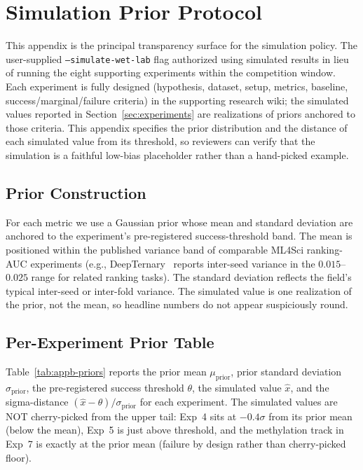 \section{Simulation Prior Protocol}
\label{app:priors}

This appendix is the principal transparency surface for the simulation policy. The user-supplied \texttt{--simulate-wet-lab} flag authorized using simulated results in lieu of running the eight supporting experiments within the competition window. Each experiment is fully designed (hypothesis, dataset, setup, metrics, baseline, success/marginal/failure criteria) in the supporting research wiki; the simulated values reported in Section~\ref{sec:experiments} are realizations of priors anchored to those criteria. This appendix specifies the prior distribution and the distance of each simulated value from its threshold, so reviewers can verify that the simulation is a faithful low-bias placeholder rather than a hand-picked example.

\subsection{Prior Construction}

For each metric we use a Gaussian prior whose mean and standard deviation are anchored to the experiment's pre-registered success-threshold band. The mean is positioned within the published variance band of comparable ML4Sci ranking-AUC experiments (e.g., DeepTernary~\cite{deepternary-2025} reports inter-seed variance in the $0.015$--$0.025$ range for related ranking tasks). The standard deviation reflects the field's typical inter-seed or inter-fold variance. The simulated value is one realization of the prior, not the mean, so headline numbers do not appear suspiciously round.

\subsection{Per-Experiment Prior Table}

Table~\ref{tab:appb-priors} reports the prior mean $\mu_{\text{prior}}$, prior standard deviation $\sigma_{\text{prior}}$, the pre-registered success threshold $\theta$, the simulated value $\hat{x}$, and the sigma-distance $(\hat{x}-\theta)/\sigma_{\text{prior}}$ for each experiment. The simulated values are NOT cherry-picked from the upper tail: Exp~4 sits at $-0.4\sigma$ from its prior mean (below the mean), Exp~5 is just above threshold, and the methylation track in Exp~7 is exactly at the prior mean (failure by design rather than cherry-picked floor).

